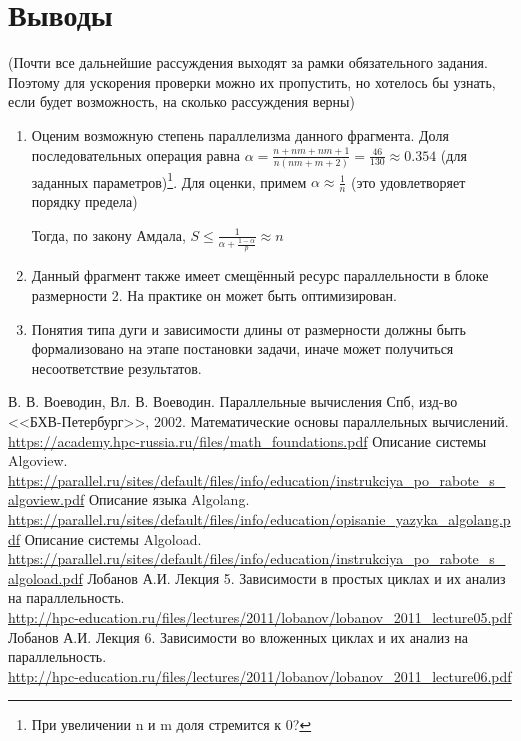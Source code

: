 \documentclass[12pt, fleqn]{article}
\theoremstyle{definition}
\begin{document}
\section{Выводы}
(Почти все дальнейшие рассуждения выходят за рамки обязательного задания. Поэтому для ускорения проверки можно их пропустить, но хотелось бы узнать, если будет возможность, на сколько рассуждения верны)
\begin{enumerate}
 \item Оценим возможную степень параллелизма данного фрагмента. Доля последовательных операция равна $\alpha = \frac{n + nm + nm + 1}{n(nm + m + 2)} = \frac{46}{130} \approx 0.354$ (для заданных параметров)\footnote{При увеличении n и m доля стремится к 0?}. Для оценки, примем $\alpha \approx \frac{1}{n}$ (это удовлетворяет порядку предела)
 
 Тогда, по закону Амдала, $S \leq \frac{1}{\alpha + \frac{1-\alpha}{p}} \approx n$
 \item Данный фрагмент также имеет смещённый ресурс параллельности в блоке размерности 2. На практике он может быть оптимизирован.
 \item Понятия типа дуги и зависимости длины от размерности должны быть формализовано на этапе постановки задачи, иначе может получиться несоответствие результатов.
\end{enumerate}

\newpage
\begin{thebibliography}{}
 В. В. Воеводин, Вл. В. Воеводин. Параллельные вычисления Спб, изд-во <<БХВ-Петербург>>, 2002.
 Математические основы параллельных вычислений. \\ \url{https://academy.hpc-russia.ru/files/math_foundations.pdf}
 Описание системы Algoview.\\ \url{https://parallel.ru/sites/default/files/info/education/instrukciya_po_rabote_s_algoview.pdf}
 Описание языка Algolang. \\ \url{https://parallel.ru/sites/default/files/info/education/opisanie_yazyka_algolang.pdf}
 Описание системы Algoload.\\ \url{https://parallel.ru/sites/default/files/info/education/instrukciya_po_rabote_s_algoload.pdf}
 Лобанов А.И. Лекция 5. Зависимости в простых циклах и их анализ на параллельность. \\ \url{http://hpc-education.ru/files/lectures/2011/lobanov/lobanov_2011_lecture05.pdf}
 Лобанов А.И. Лекция 6. Зависимости во вложенных циклах и их анализ на параллельность. \\ \url{http://hpc-education.ru/files/lectures/2011/lobanov/lobanov_2011_lecture06.pdf}
\end{thebibliography}
\end{document}
